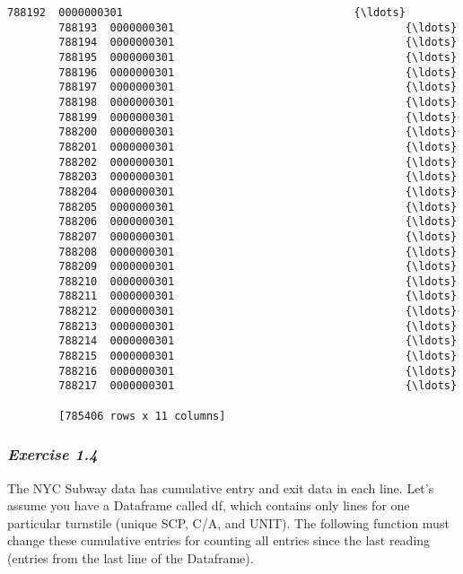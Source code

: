 \documentclass[11pt]{article}
\begin{document}
\begin{Verbatim}[commandchars=\\\{\}]
        788192  0000000301                                    {\ldots}  
        788193  0000000301                                    {\ldots}  
        788194  0000000301                                    {\ldots}  
        788195  0000000301                                    {\ldots}  
        788196  0000000301                                    {\ldots}  
        788197  0000000301                                    {\ldots}  
        788198  0000000301                                    {\ldots}  
        788199  0000000301                                    {\ldots}  
        788200  0000000301                                    {\ldots}  
        788201  0000000301                                    {\ldots}  
        788202  0000000301                                    {\ldots}  
        788203  0000000301                                    {\ldots}  
        788204  0000000301                                    {\ldots}  
        788205  0000000301                                    {\ldots}  
        788206  0000000301                                    {\ldots}  
        788207  0000000301                                    {\ldots}  
        788208  0000000301                                    {\ldots}  
        788209  0000000301                                    {\ldots}  
        788210  0000000301                                    {\ldots}  
        788211  0000000301                                    {\ldots}  
        788212  0000000301                                    {\ldots}  
        788213  0000000301                                    {\ldots}  
        788214  0000000301                                    {\ldots}  
        788215  0000000301                                    {\ldots}  
        788216  0000000301                                    {\ldots}  
        788217  0000000301                                    {\ldots}  
        
        [785406 rows x 11 columns]
\end{Verbatim}
            
    \subsubsection{\texorpdfstring{\emph{Exercise
1.4}}{Exercise 1.4}}\label{exercise-1.4}

The NYC Subway data has cumulative entry and exit data in each line.
Let's assume you have a Dataframe called df, which contains only lines
for one particular turnstile (unique SCP, C/A, and UNIT). The following
function must change these cumulative entries for counting all entries
since the last reading (entries from the last line of the Dataframe).
\end{document}
